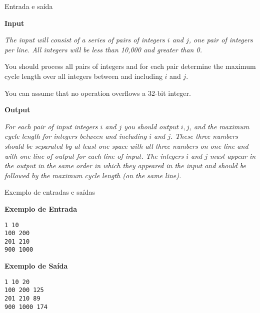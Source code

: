 \begin{frame}[fragile]{Entrada e saída}

\textbf{Input}

{\it
The input will consist of a series of pairs of integers $i$ and $j$, one pair of integers per line. All integers will be less than 10,000 and greater than 0.

You should process all pairs of integers and for each pair determine the maximum cycle length over
all integers between and including $i$ and $j$.

You can assume that no operation overflows a 32-bit integer.
}

\vspace{0.1in}

\textbf{Output}

{\it
For each pair of input integers $i$ and $j$ you should output $i, j$, and the maximum cycle length 
for integers between and including $i$ and $j$. These three numbers should be separated by at 
least one space with all three numbers on one line and with one line of output for each line of 
input. The integers $i$ and $j$ must
appear in the output in the same order in which they appeared in the input and should be followed by
the maximum cycle length (on the same line).
}
\end{frame}

\begin{frame}[fragile]{Exemplo de entradas e saídas}

\begin{minipage}[t]{0.5\textwidth}
\textbf{Exemplo de Entrada}
\begin{verbatim}
1 10
100 200
201 210
900 1000
\end{verbatim}
\end{minipage}
\begin{minipage}[t]{0.45\textwidth}
\textbf{Exemplo de Saída}
\begin{verbatim}
1 10 20
100 200 125
201 210 89
900 1000 174
\end{verbatim}
\end{minipage}
\end{frame}

